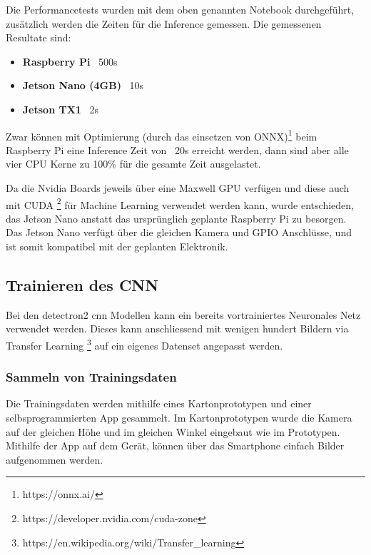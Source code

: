 
Die Performancetests wurden mit dem oben genannten Notebook durchgeführt, zusätzlich werden die Zeiten für die
Inference gemessen. Die gemessenen Resultate sind:

\begin{itemize}
    \item {\bf Raspberry Pi}  ~500s
    \item {\bf Jetson Nano (4GB)} ~10s
    \item {\bf Jetson TX1} ~2s
\end{itemize}

Zwar können mit Optimierung (durch das einsetzen von ONNX)\footnote{https://onnx.ai/} beim Raspberry Pi eine Inference Zeit von ~20s erreicht werden, 
dann sind aber alle vier CPU Kerne zu 100\% für die gesamte Zeit ausgelastet.

Da die Nvidia Boards jeweils über eine Maxwell GPU verfügen und diese auch mit CUDA \footnote{https://developer.nvidia.com/cuda-zone}
für Machine Learning verwendet werden kann, wurde entschieden, das Jetson Nano anstatt das ursprünglich geplante
Raspberry Pi zu besorgen. Das Jetson Nano verfügt über die gleichen Kamera und GPIO Anschlüsse, und 
ist somit kompatibel mit der geplanten Elektronik.

\subsection{Trainieren des CNN}

Bei den detectron2 \acrshort{cnn} Modellen kann ein bereits vortrainiertes Neuronales Netz
verwendet werden. Dieses kann anschliessend mit wenigen hundert Bildern via Transfer Learning \footnote{https://en.wikipedia.org/wiki/Transfer\_learning}
auf ein eigenes Datenset angepasst werden.

\subsubsection{Sammeln von Trainingsdaten}

Die Trainingsdaten werden mithilfe eines Kartonprototypen und einer selbsprogrammierten App gesammelt.
Im Kartonprototypen wurde die Kamera auf der gleichen Höhe und im gleichen Winkel eingebaut
wie im Prototypen.
Mithilfe der App auf dem Gerät, können über das Smartphone einfach Bilder aufgenommen werden.


